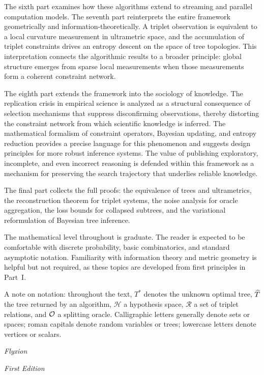 The sixth part examines how these algorithms extend to streaming and parallel computation models. The seventh part reinterprets the entire framework geometrically and information-theoretically. A triplet observation is equivalent to a local curvature measurement in ultrametric space, and the accumulation of triplet constraints drives an entropy descent on the space of tree topologies. This interpretation connects the algorithmic results to a broader principle: global structure emerges from sparse local measurements when those measurements form a coherent constraint network.

The eighth part extends the framework into the sociology of knowledge. The replication crisis in empirical science is analyzed as a structural consequence of selection mechanisms that suppress disconfirming observations, thereby distorting the constraint network from which scientific knowledge is inferred. The mathematical formalism of constraint operators, Bayesian updating, and entropy reduction provides a precise language for this phenomenon and suggests design principles for more robust inference systems. The value of publishing exploratory, incomplete, and even incorrect reasoning is defended within this framework as a mechanism for preserving the search trajectory that underlies reliable knowledge.

The final part collects the full proofs: the equivalence of trees and ultrametrics, the reconstruction theorem for triplet systems, the noise analysis for oracle aggregation, the loss bounds for collapsed subtrees, and the variational reformulation of Bayesian tree inference.

The mathematical level throughout is graduate. The reader is expected to be comfortable with discrete probability, basic combinatorics, and standard asymptotic notation. Familiarity with information theory and metric geometry is helpful but not required, as these topics are developed from first principles in Part~I.

A note on notation: throughout the text, $T^*$ denotes the unknown optimal tree, $\widehat{T}$ the tree returned by an algorithm, $\mathcal{H}$ a hypothesis space, $\mathcal{R}$ a set of triplet relations, and $\mathcal{O}$ a splitting oracle. Calligraphic letters generally denote sets or spaces; roman capitals denote random variables or trees; lowercase letters denote vertices or scalars.

\bigskip
\noindent
\textit{Flyxion}

\noindent
\textit{First Edition}

